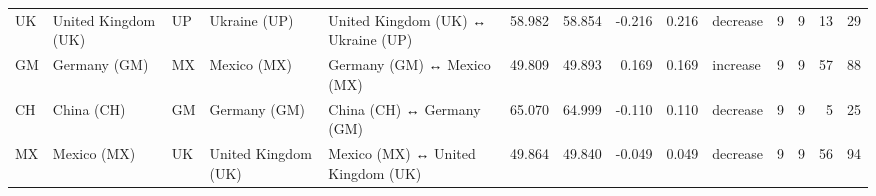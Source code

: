 \begin{tabular}{lllllrrrrlrrrr}
UK & United Kingdom (UK) & UP & Ukraine (UP) & United Kingdom (UK) ↔ Ukraine (UP) & 58.982 & 58.854 & -0.216 & 0.216 & decrease & 9 & 9 & 13 & 29 \\
GM & Germany (GM) & MX & Mexico (MX) & Germany (GM) ↔ Mexico (MX) & 49.809 & 49.893 & 0.169 & 0.169 & increase & 9 & 9 & 57 & 88 \\
CH & China (CH) & GM & Germany (GM) & China (CH) ↔ Germany (GM) & 65.070 & 64.999 & -0.110 & 0.110 & decrease & 9 & 9 & 5 & 25 \\
MX & Mexico (MX) & UK & United Kingdom (UK) & Mexico (MX) ↔ United Kingdom (UK) & 49.864 & 49.840 & -0.049 & 0.049 & decrease & 9 & 9 & 56 & 94 \\
\bottomrule
\end{tabular}
